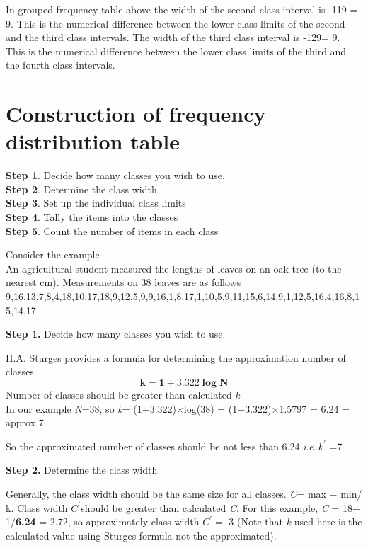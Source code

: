 \documentclass[
]{book}
\begin{document}
In grouped frequency table above the width of the second class interval
is -119\textbar{} = 9. This is the numerical difference between the lower
class limits of the second and the third class intervals. The width of
the third class interval is -129\textbar= 9. This is the numerical
difference between the lower class limits of the third and the fourth class intervals.

\section{Construction of frequency distribution table}\label{construction-of-frequency-distribution-table}

\textbf{Step 1}. Decide how many classes you wish to use.\\
\textbf{Step 2}. Determine the class width\\
\textbf{Step 3}. Set up the individual class limits\\
\textbf{Step 4}. Tally the items into the classes\\
\textbf{Step 5}. Count the number of items in each class

Consider the example\\
An agricultural student measured the lengths of leaves on an oak tree
(to the nearest cm). Measurements on 38 leaves are as follows\\
9,16,13,7,8,4,18,10,17,18,9,12,5,9,9,16,1,8,17,1,10,5,9,11,15,6,14,9,1,12,5,16,4,16,8,15,14,17

\textbf{Step 1.} Decide how many classes you wish to use.

H.A. Sturges provides a formula for determining the approximation number
of classes. \[\mathbf{k = 1 + 3.322}\mathbf{\log}\mathbf{N}\] Number of
classes should be greater than calculated \emph{k}\\
In our example \emph{N}=38, so \emph{k}= (1+3.322)×log(38) = (1+3.322)×1.5797 =
6.24 = approx 7

So the approximated number of classes should be not less than 6.24
\emph{i}.\emph{e}.\(\ k^{'}\) =7

\textbf{Step 2.} Determine the class width

Generally, the class width should be the same size for all classes. \emph{C}=
\textbar{} max − min\textbar/ k. Class width \(C^{'}\)should be greater than calculated
\emph{C}. For this example, \emph{C} = \textbar{} 18− 1\textbar/\textbf{6.24} = 2.72, so
approximately class width \(C^{'} =\) 3 (Note that \emph{k} used here is the
calculated value using Sturges formula not the approximated).
\end{document}
